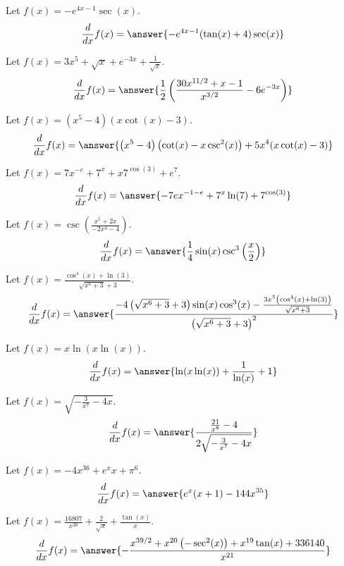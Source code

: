 \documentclass{ximera}
\begin{document}
\begin{shuffle}
\begin{exercise}
Let $f(x)=-e^{4 x-1} \sec (x)$.
\[
\ddx f(x) = \answer{-e^{4 x-1} (\tan (x)+4) \sec (x)}
\]
\end{exercise}

\begin{exercise}
Let $f(x)=3 x^5+\sqrt{x}+e^{-3 x}+\frac{1}{\sqrt{x}}$.
\[
\ddx f(x) = \answer{\frac{1}{2} \left(\frac{30 x^{11/2}+x-1}{x^{3/2}}-6 e^{-3 x}\right)}
\]
\end{exercise}

\begin{exercise}
Let $f(x)=\left(x^5-4\right) (x \cot (x)-3)$.
\[
\ddx f(x) = \answer{\left(x^5-4\right) \left(\cot (x)-x \csc ^2(x)\right)+5 x^4 (x \cot (x)-3)}
\]
\end{exercise}

\begin{exercise}
Let $f(x)=7 x^{-e}+7^x+x 7^{\cos (3)}+e^7$.
\[
\ddx f(x) = \answer{-7 e x^{-1-e}+7^x \ln (7)+7^{\cos (3)}}
\]
\end{exercise}

\begin{exercise}
Let $f(x)=\csc \left(\frac{x^5+2 x}{-2 x^4-4}\right)$.
\[
\ddx f(x) = \answer{\frac{1}{4} \sin (x) \csc ^3\left(\frac{x}{2}\right)}
\]
\end{exercise}

\begin{exercise}
Let $f(x)=\frac{\cos ^4(x)+\ln (3)}{\sqrt{x^6+3}+3}$.
\[
\ddx f(x) = \answer{\frac{-4 \left(\sqrt{x^6+3}+3\right) \sin (x) \cos ^3(x)-\frac{3 x^5 \left(\cos ^4(x)+\ln (3)\right)}{\sqrt{x^6+3}}}{\left(\sqrt{x^6+3}+3\right)^2}}
\]
\end{exercise}

\begin{exercise}
Let $f(x)=x \ln (x \ln (x))$.
\[
\ddx f(x) = \answer{\ln (x \ln (x))+\frac{1}{\ln (x)}+1}
\]
\end{exercise}

\begin{exercise}
Let $f(x)=\sqrt{-\frac{3}{x^7}-4 x}$.
\[
\ddx f(x) = \answer{\frac{\frac{21}{x^8}-4}{2 \sqrt{-\frac{3}{x^7}-4 x}}}
\]
\end{exercise}

\begin{exercise}
Let $f(x)=-4 x^{36}+e^x x+\pi ^6$.
\[
\ddx f(x) = \answer{e^x (x+1)-144 x^{35}}
\]
\end{exercise}

\begin{exercise}
Let $f(x)=\frac{16807}{x^{20}}+\frac{2}{\sqrt{x}}+\frac{\tan (x)}{x}$.
\[
\ddx f(x) = \answer{-\frac{x^{39/2}+x^{20} \left(-\sec ^2(x)\right)+x^{19} \tan (x)+336140}{x^{21}}}
\]
\end{exercise}


\end{shuffle}
\end{document}
